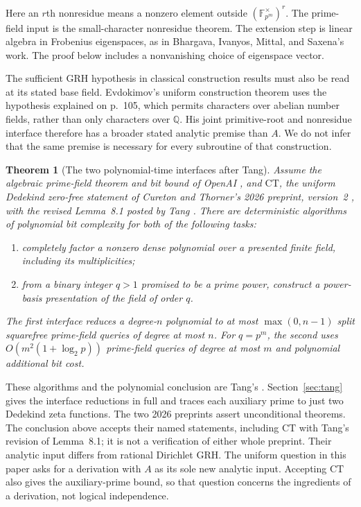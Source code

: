 \documentclass[11pt]{article}
\newcommand{\F}{\mathbb F}
\newtheorem{theorem}{Theorem}[section]
\theoremstyle{definition}
\theoremstyle{remark}
\begin{document}
Here an $r$th nonresidue means a nonzero element outside
$(\F_{p^m}^{\times})^r$.  The prime-field input is the small-character
nonresidue theorem.  The extension step is linear algebra in Frobenius
eigenspaces, as in Bhargava, Ivanyos, Mittal, and Saxena's work.
The proof below includes a nonvanishing choice of eigenspace vector.


The sufficient GRH hypothesis in classical construction results must
also be read at its stated base field. Evdokimov's uniform construction
theorem \citep[Theorem~1.1, pp.~107--108]{Evdokimov1989}
uses the hypothesis explained on p.~105, which permits characters over
abelian number fields, rather than only characters over \(\mathbb Q\).
His joint primitive-root and nonresidue interface therefore has a
broader stated analytic premise than \(A\). We do not infer that the
same premise is necessary for every subroutine of that construction.

\begin{theorem}[The two polynomial-time interfaces after Tang]
\label{thm:tangfront}
Assume the algebraic prime-field theorem and bit bound of OpenAI
\citep[Theorem~1.2, p.~3; Proposition~10.1, pp.~41--44]{OpenAI2026},
and \(\mathrm{CT}\), the uniform Dedekind zero-free statement of
Cureton and Thorner's 2026 preprint, version~2
\citep[Theorem~1.1, p.~3]{CT2026}, with the revised Lemma~8.1
posted by Tang \citep{TangCTReview2026}.
There are deterministic algorithms of polynomial bit complexity for
both of the following tasks:
\begin{enumerate}
\item completely factor a nonzero dense polynomial over a presented
finite field, including its multiplicities;
\item from a binary integer $q>1$ promised to be a prime power,
construct a power-basis presentation of the field of order $q$.
\end{enumerate}
The first interface reduces a degree-$n$ polynomial to at most
$\max(0,n-1)$ split squarefree prime-field queries of degree at most $n$.
For $q=p^m$, the second uses $O(m^2(1+\log_2p))$ prime-field
queries of degree at most $m$ and polynomial additional bit cost.
\end{theorem}

These algorithms and the polynomial conclusion are Tang's
\citep[Theorem~1.1 and Propositions~3.1, 4.1, pp.~2, 4--7]{Tang2026}.
Section~\ref{sec:tang} gives the interface reductions in full and
traces each auxiliary prime to just two Dedekind zeta functions.
The two 2026 preprints assert unconditional theorems. The conclusion
above accepts their named statements, including \(\mathrm{CT}\) with
Tang's revision of Lemma~8.1; it is not a verification of either whole
preprint. Their analytic input differs from rational Dirichlet GRH.
The uniform question in this paper asks for a derivation with \(A\)
as its sole new analytic input. Accepting \(\mathrm{CT}\) also gives
the auxiliary-prime bound, so that question concerns the ingredients
of a derivation, not logical independence.
\end{document}
